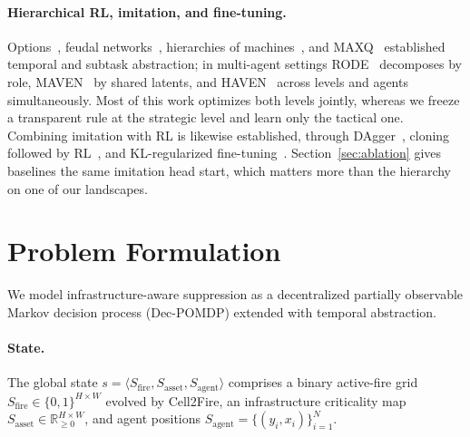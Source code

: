 \documentclass[letterpaper]{article}
\begin{document}
\paragraph{Hierarchical RL, imitation, and fine-tuning.} Options~\citep{sutton1999options}, feudal networks~\citep{vezhnevets2017feudal}, hierarchies of machines~\citep{parr1997hams}, and MAXQ~\citep{dietterich1998maxq} established temporal and subtask abstraction; in multi-agent settings RODE~\citep{wang2021rode} decomposes by role, MAVEN~\citep{mahajan2019maven} by shared latents, and HAVEN~\citep{xu2023haven} across levels and agents simultaneously. Most of this work optimizes both levels jointly, whereas we freeze a transparent rule at the strategic level and learn only the tactical one. Combining imitation with RL is likewise established, through DAgger~\citep{ross2011reduction}, cloning followed by RL~\citep{silver2016mastering, rajeswaran2018learning}, and KL-regularized fine-tuning~\citep{wu2019behavior}. Section~\ref{sec:ablation} gives baselines the same imitation head start, which matters more than the hierarchy on one of our landscapes.

\section{Problem Formulation}
\label{sec:formulation}

We model infrastructure-aware suppression as a decentralized partially observable Markov decision process (Dec-POMDP) extended with temporal abstraction.

\paragraph{State.} The global state $s = \langle S_{\text{fire}}, S_{\text{asset}}, S_{\text{agent}} \rangle$ comprises a binary active-fire grid $S_{\text{fire}} \in \{0,1\}^{H \times W}$ evolved by Cell2Fire, an infrastructure criticality map $S_{\text{asset}} \in \mathbb{R}_{\geq 0}^{H \times W}$, and agent positions $S_{\text{agent}} = \{(y_i, x_i)\}_{i=1}^N$.
\end{document}
